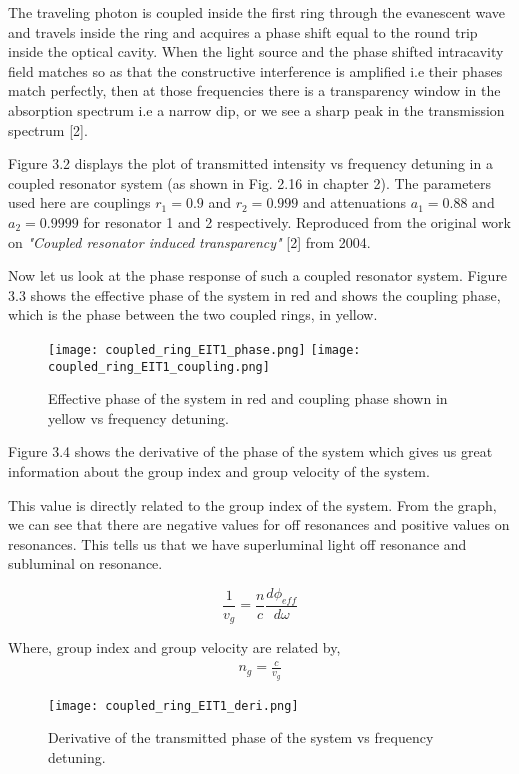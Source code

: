 The traveling photon is coupled inside the first ring through the evanescent wave and travels inside the ring and acquires a phase shift equal to the round trip inside the optical cavity. When the light source and the phase shifted intracavity field matches so as that the constructive interference is amplified i.e their phases match perfectly, then at those frequencies there is a transparency window in the absorption spectrum i.e a narrow dip, or we see a sharp peak in the transmission spectrum [2].


Figure 3.2 displays the plot of transmitted intensity vs frequency detuning in a coupled resonator system (as shown in Fig. 2.16 in chapter 2). The parameters used here are couplings $r_{1} = 0.9$ and $r_{2} = 0.999$ and attenuations $a_{1} = 0.88$ and $a_{2} = 0.9999$ for resonator 1 and 2 respectively. Reproduced from the original work on \textit{"Coupled resonator induced transparency"} [2] from 2004.


Now let us look at the phase response of such a coupled resonator system. Figure 3.3 shows the effective phase of the system in red and shows the coupling phase, which is the phase between the two coupled rings, in yellow. 

\begin{figure}[h]
\texttt{[image: coupled\_ring\_EIT1\_phase.png]}
\texttt{[image: coupled\_ring\_EIT1\_coupling.png]}
\caption{Effective phase of the system in red and coupling phase shown in yellow vs frequency detuning.}
\end{figure}

Figure 3.4 shows the derivative of the phase of the system which gives us great information about the group index and group velocity of the system. 

This value is directly related to the group index of the system. From the graph, we can see that there are negative values for off resonances and positive values on resonances. This tells us that we have superluminal light off resonance and subluminal on resonance. 

\begin{equation}
\frac{1}{v_{g}} = \frac{n}{c} \frac{d\phi_{eff}}{d\omega}
\end{equation}

Where, group index and group velocity are related by, 
\begin{align*}
n_{g} = \frac{c}{v_{g}}
\end{align*}

\begin{figure}[h]
\centering
\texttt{[image: coupled\_ring\_EIT1\_deri.png]}
\caption{Derivative of the transmitted phase of the system vs frequency detuning.}
\end{figure}

